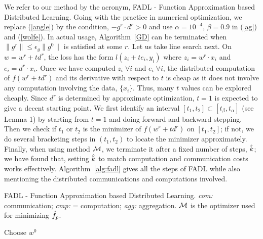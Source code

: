 \documentclass[twoside, 11pt]{article}
\begin{document}
We refer to our method by the acronym, FADL - Function Approximation based Distributed Learning.
Going with the practice in numerical optimization, we replace (\ref{angle}) by the condition, $-g^r\cdot d^r > 0$ and use $\alpha=10^{-4}$, $\beta=0.9$ in (\ref{ag}) and (\ref{wolfe}). In actual usage,  Algorithm~\ref{GD} can be terminated when $\|g^r\|\le \epsilon_g\|g^0\|$ is satisfied at some $r$. Let us take line search next. On $w=w^r+t d^r$, the loss has the form $l(z_i+te_i,y_i)$ where $z_i=w^r\cdot x_i$ and $e_i=d^r\cdot x_i$. Once we have computed $z_i\;\forall i$ and $e_i\;\forall i$, the distributed computation of $f(w^r+t d^r)$ and its derivative with respect to $t$ is cheap as it does not involve any computation involving the data, $\{x_i\}$. Thus, many $t$ values can be explored cheaply. Since $d^r$ is determined by approximate optimization, $t=1$ is expected to give a decent starting point. We first identify an interval $[t_1,t_2]\subset [t_\beta,t_\alpha]$ (see Lemma 1) by starting from $t=1$ and doing forward and backward stepping. Then we check if $t_1$ or $t_2$ is the minimizer of $f(w^r+t d^r)$ on $[t_1,t_2]$; if not, we do several bracketing steps in $(t_1,t_2)$ to locate the minimizer approximately. Finally, when using method ${\cal M}$, we terminate it after a fixed number of steps, $\hat{k}$; we have found that, setting $\hat{k}$ to match computation and communication costs works effectively. Algorithm~\ref{alg:fadl} gives all the steps of FADL while also mentioning the distributed communications and computations involved.

\begin{algorithm2e}
\label{alg:fadl}
\caption{FADL - Function Approximation based Distributed Learning.
{\it com:} communication; {\it cmp:} = computation; {\it agg:} aggregation. ${\cal M}$ is the optimizer used for minimizing $\hat{f}_p$.}
Choose $w^0$\;
\end{algorithm2e}
\end{document}
